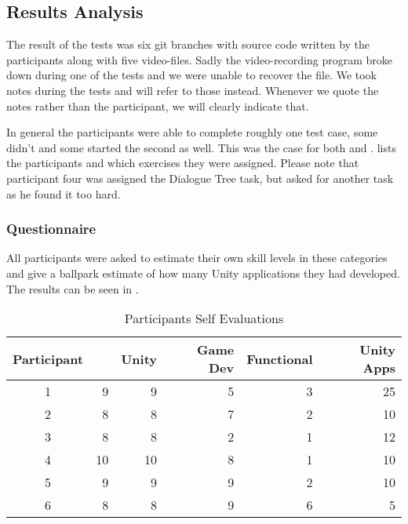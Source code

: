 \subsection{Results Analysis} \label{sec:test-results}
The result of the tests was six git branches with source code written by the participants along with five video-files. Sadly the video-recording program broke down during one of the tests and we were unable to recover the file. We took notes during the tests and will refer to those instead. Whenever we quote the notes rather than the participant, we will clearly indicate that.

In general the participants were able to complete roughly one test case, some didn't and some started the second as well. This was the case for both \fsh and \csh.  lists the participants and which exercises they were assigned. Please note that participant four was assigned the Dialogue Tree task, but asked for another task as he found it too hard.


\subsubsection{Questionnaire}
All participants were asked to estimate their own skill levels in these categories and give a ballpark estimate of how many Unity applications they had developed. The results can be seen in .

\begin{table}[H]
\begin{tabular}{| c | r | r | r | r | r |}
	\hline
	\textbf{Participant}&\textbf{\csh}&\textbf{Unity}&\textbf{Game Dev}&\textbf{Functional}&\textbf{Unity Apps} \\ \hline
	1 & 9 & 9 & 5 & 3 & 25 \\ \hline
	2 & 8 & 8 & 7 & 2 & 10 \\ \hline
	3 & 8 & 8 & 2 & 1 & 12 \\ \hline
	4 & 10 & 10 & 8 & 1 & 10 \\ \hline
	5 & 9 & 9 & 9 & 2 & 10 \\ \hline
	6 & 8 & 8 & 9 & 6 & 5 \\ \hline
\end{tabular}
\caption{Participants Self Evaluations}
\label{tab:participant-scores}
\end{table}

